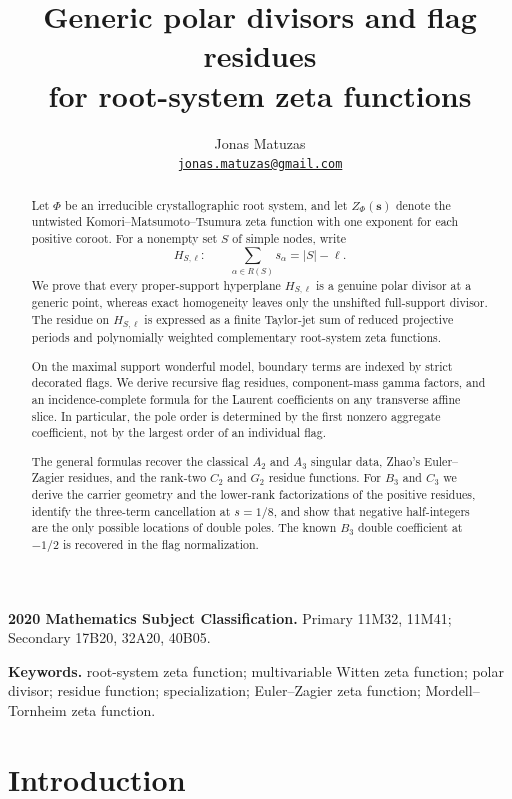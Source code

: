 \documentclass[11pt]{article}
\title{Generic polar divisors and flag residues\\
for root-system zeta functions}
\author{Jonas Matuzas\\
\href{mailto:jonas.matuzas@gmail.com}{\texttt{jonas.matuzas@gmail.com}}}
\date{}
\begin{document}
\maketitle

\begin{abstract}
Let \(\Phi\) be an irreducible crystallographic root system, and let
\(Z_\Phi(\mathbf s)\) denote the untwisted Komori--Matsumoto--Tsumura
zeta function with one exponent for each positive coroot.  For a
nonempty set \(S\) of simple nodes, write
\[
 H_{S,\ell}:\qquad
 \sum_{\alpha\in R(S)}s_\alpha=|S|-\ell .
\]
We prove that every proper-support hyperplane \(H_{S,\ell}\) is a
genuine polar divisor at a generic point, whereas exact homogeneity
leaves only the unshifted full-support divisor.  The residue on
\(H_{S,\ell}\) is expressed as a finite Taylor-jet sum of reduced
projective periods and polynomially weighted complementary
root-system zeta functions.

On the maximal support wonderful model, boundary terms are indexed by
strict decorated flags.  We derive recursive flag residues,
component-mass gamma factors, and an incidence-complete formula for
the Laurent coefficients on any transverse affine slice.  In
particular, the pole order is determined by the first nonzero
aggregate coefficient, not by the largest order of an individual
flag.

The general formulas recover the classical \(A_2\) and \(A_3\)
singular data, Zhao's Euler--Zagier residues, and the rank-two
\(C_2\) and \(G_2\) residue functions.  For \(B_3\) and \(C_3\) we
derive the carrier geometry and the lower-rank factorizations of the
positive residues, identify the three-term cancellation at
\(s=1/8\), and show that negative half-integers are the only possible
locations of double poles.  The known \(B_3\) double coefficient at
\(-1/2\) is recovered in the flag normalization.
\end{abstract}

\noindent\textbf{2020 Mathematics Subject Classification.}
Primary 11M32, 11M41; Secondary 17B20, 32A20, 40B05.

\noindent\textbf{Keywords.}
root-system zeta function; multivariable Witten zeta function; polar
divisor; residue function; specialization; Euler--Zagier zeta function;
Mordell--Tornheim zeta function.

\section{Introduction}
\end{document}
